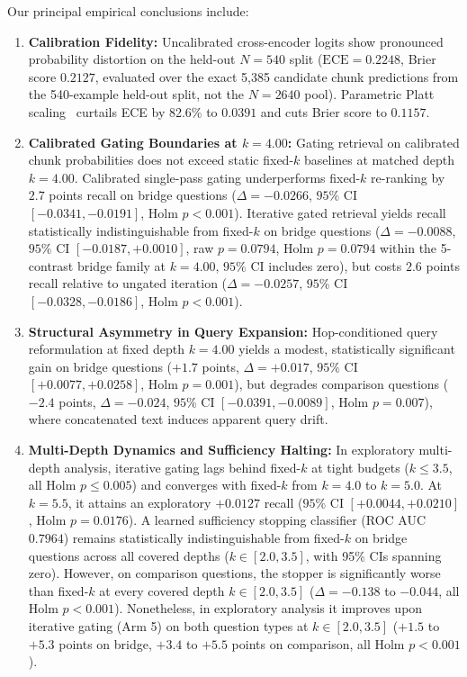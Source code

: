 \documentclass{article}
\begin{document}
Our principal empirical conclusions include:
\begin{enumerate}
    \item \textbf{Calibration Fidelity:} Uncalibrated cross-encoder logits show pronounced probability distortion on the held-out $N=540$ split ($\text{ECE}=0.2248$, Brier score $0.2127$, evaluated over the exact 5,385 candidate chunk predictions from the 540-example held-out split, not the $N=2640$ pool). Parametric Platt scaling~\cite{platt1999probabilistic} curtails ECE by 82.6\% to $0.0391$ and cuts Brier score to $0.1157$.
    \item \textbf{Calibrated Gating Boundaries at $k=4.00$:} Gating retrieval on calibrated chunk probabilities does not exceed static fixed-$k$ baselines at matched depth $k=4.00$. Calibrated single-pass gating underperforms fixed-$k$ re-ranking by $2.7$ points recall on bridge questions ($\Delta = -0.0266$, $95\%$ CI $[-0.0341, -0.0191]$, Holm $p < 0.001$). Iterative gated retrieval yields recall statistically indistinguishable from fixed-$k$ on bridge questions ($\Delta = -0.0088$, $95\%$ CI $[-0.0187, +0.0010]$, raw $p=0.0794$, Holm $p=0.0794$ within the 5-contrast bridge family at $k=4.00$, $95\%$ CI includes zero), but costs $2.6$ points recall relative to ungated iteration ($\Delta = -0.0257$, $95\%$ CI $[-0.0328, -0.0186]$, Holm $p < 0.001$).
    \item \textbf{Structural Asymmetry in Query Expansion:} Hop-conditioned query reformulation at fixed depth $k=4.00$ yields a modest, statistically significant gain on bridge questions ($+1.7$ points, $\Delta = +0.017$, $95\%$ CI $[+0.0077, +0.0258]$, Holm $p=0.001$), but degrades comparison questions ($-2.4$ points, $\Delta = -0.024$, $95\%$ CI $[-0.0391, -0.0089]$, Holm $p=0.007$), where concatenated text induces apparent query drift.
    \item \textbf{Multi-Depth Dynamics and Sufficiency Halting:} In exploratory multi-depth analysis, iterative gating lags behind fixed-$k$ at tight budgets ($k \le 3.5$, all Holm $p \le 0.005$) and converges with fixed-$k$ from $k=4.0$ to $k=5.0$. At $k=5.5$, it attains an exploratory $+0.0127$ recall ($95\%$ CI $[+0.0044, +0.0210]$, Holm $p=0.0176$). A learned sufficiency stopping classifier (ROC AUC $0.7964$) remains statistically indistinguishable from fixed-$k$ on bridge questions across all covered depths ($k \in [2.0, 3.5]$, with 95\% CIs spanning zero). However, on comparison questions, the stopper is significantly worse than fixed-$k$ at every covered depth $k \in [2.0, 3.5]$ ($\Delta = -0.138$ to $-0.044$, all Holm $p < 0.001$). Nonetheless, in exploratory analysis it improves upon iterative gating (Arm 5) on both question types at $k \in [2.0, 3.5]$ ($+1.5$ to $+5.3$ points on bridge, $+3.4$ to $+5.5$ points on comparison, all Holm $p < 0.001$).
\end{enumerate}
\end{document}
